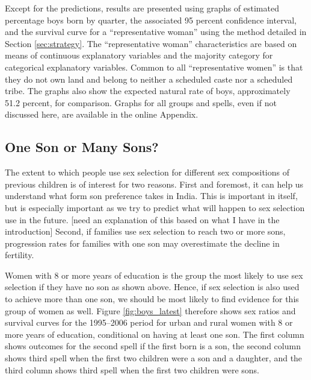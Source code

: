 \documentclass[12pt,letterpaper]{article}
\begin{document}
Except for the predictions, results are presented using graphs of estimated percentage boys 
born by quarter, the associated 95 percent confidence interval, and the survival curve for 
a ``representative woman'' using the method detailed in Section \ref{sec:strategy}.
The ``representative woman'' characteristics are based on means of continuous 
explanatory variables and the majority category for categorical explanatory variables.
Common to all ``representative women'' is that they do not own land and belong to neither 
a scheduled caste nor a scheduled tribe.
The graphs also show the expected natural rate of boys, approximately 51.2 percent, for
comparison.
Graphs for all groups and spells, even if not discussed here, are available in 
the online Appendix.


\subsection{One Son or Many Sons?}

The extent to which people use sex selection for different sex compositions
of previous children is of interest for two reasons.
First and foremost, it can help us understand what form son preference takes in India.
This is important in itself, but is especially important as we try to predict 
what will happen to sex selection use in the future.
[need an explanation of this based on what I have in the introduction]
Second,
if families use sex selection to reach two or more sons, progression rates for families 
with one son may overestimate the decline in fertility.

Women with 8 or more years of education is the group the most likely to use sex 
selection if they have no son as shown above.
Hence, if sex selection is also used to achieve more than one son, we should be
most likely to find evidence for this group of women as well.
Figure \ref{fig:boys_latest} therefore shows sex ratios and survival curves for 
the 1995--2006 period for urban and rural women with 8 or more years of education, 
conditional on having at least one son.
The first column shows outcomes for the second spell if the first born is a son,
the second column shows third spell when the first two children were a son and 
a daughter, and the third column shows third spell when the first two children were sons.
\end{document}
